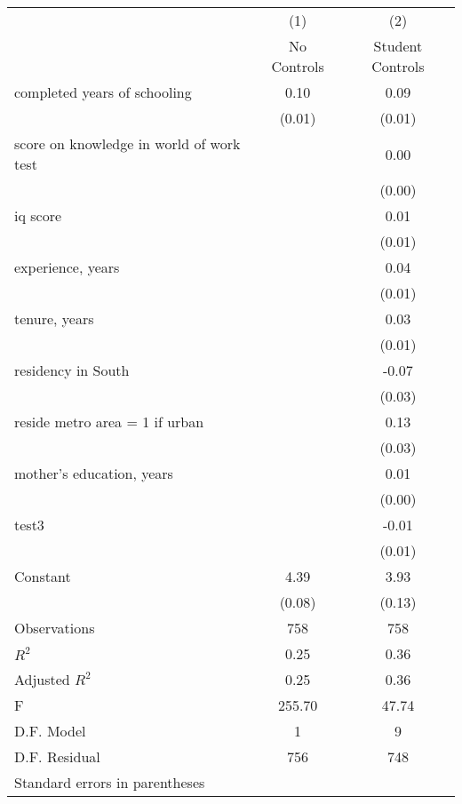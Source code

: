 \begin{tabular}{l*{2}{c}}
\hline\hline
                    &\multicolumn{1}{c}{(1)}&\multicolumn{1}{c}{(2)}\\
                    &\multicolumn{1}{c}{No Controls}&\multicolumn{1}{c}{Student Controls}\\
\hline
completed years of schooling&        0.10&        0.09\\
                    &      (0.01)&      (0.01)\\
[1em]
score on knowledge in world of work test&            &        0.00\\
                    &            &      (0.00)\\
[1em]
iq score            &            &        0.01\\
                    &            &      (0.01)\\
[1em]
experience, years   &            &        0.04\\
                    &            &      (0.01)\\
[1em]
tenure, years       &            &        0.03\\
                    &            &      (0.01)\\
[1em]
residency in South  &            &       -0.07\\
                    &            &      (0.03)\\
[1em]
reside metro area = 1 if urban&            &        0.13\\
                    &            &      (0.03)\\
[1em]
mother's education, years&            &        0.01\\
                    &            &      (0.00)\\
[1em]
test3               &            &       -0.01\\
                    &            &      (0.01)\\
[1em]
Constant            &        4.39&        3.93\\
                    &      (0.08)&      (0.13)\\
\hline
Observations        &         758&         758\\
\(R^{2}\)           &        0.25&        0.36\\
Adjusted \(R^{2}\)  &        0.25&        0.36\\
F                   &      255.70&       47.74\\
D.F. Model          &           1&           9\\
D.F. Residual       &         756&         748\\
\hline\hline
\multicolumn{3}{l}{\footnotesize Standard errors in parentheses}\\
\end{tabular}
